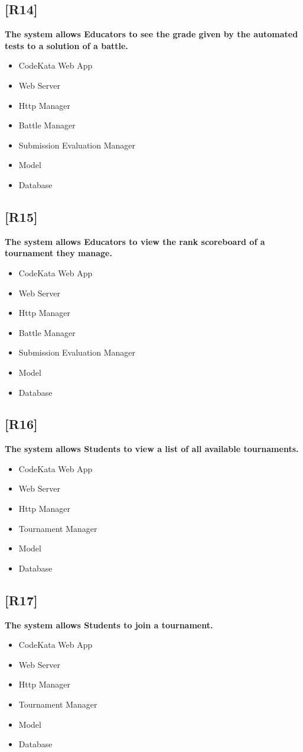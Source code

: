 \documentclass{article}
\begin{document}
\subsection{[R14]}
\textbf{ The system allows Educators to see the grade given by the automated tests to a solution of a battle.}
\begin{itemize}
\item CodeKata Web App
\item Web Server
\item Http Manager
\item Battle Manager
\item Submission Evaluation Manager
\item Model
\item Database
\end{itemize}
\subsection{[R15]}
\textbf{ The system allows Educators to view the rank scoreboard of a tournament they manage.}
\begin{itemize}
\item CodeKata Web App
\item Web Server
\item Http Manager
\item Battle Manager
\item Submission Evaluation Manager
\item Model
\item Database
\end{itemize}
\subsection{[R16]}
\textbf{ The system allows Students to view a list of all available tournaments.}
\begin{itemize}
\item CodeKata Web App
\item Web Server
\item Http Manager
\item Tournament Manager
\item Model
\item Database
\end{itemize}
\subsection{[R17]}
\textbf{ The system allows Students to join a tournament.}
\begin{itemize}
\item CodeKata Web App
\item Web Server
\item Http Manager
\item Tournament Manager
\item Model
\item Database
\end{itemize}
\end{document}
